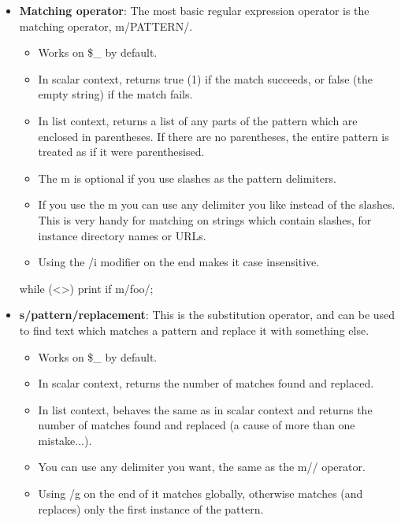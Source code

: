 \documentclass{report}
\begin{document}
    \pagebreak 
    \begin{itemize}
        \item \textbf{Matching operator}: The most basic regular expression operator is the matching operator, m/PATTERN/.
            \begin{itemize}
                \item Works on \$\_ by default.
                \item In scalar context, returns true (1) if the match succeeds, or false (the empty string) if the match fails.
                \item In list context, returns a list of any parts of the pattern which are enclosed in parentheses. If there are no parentheses, the entire pattern is treated as if it were parenthesised.
                \item The m is optional if you use slashes as the pattern delimiters.
                \item If you use the m you can use any delimiter you like instead of the slashes. This is very handy for matching on strings which contain slashes, for instance directory names or URLs.
                \item Using the /i modifier on the end makes it case insensitive.
            \end{itemize}
            \bigbreak \noindent 
            \begin{perlcode}
                while (<>) {
                    print if m/foo/;
                }
            \end{perlcode}
        \item \textbf{s/pattern/replacement}: This is the substitution operator, and can be used to find text which matches a pattern and replace it with something else.
            \begin{itemize}
                \item Works on \$\_ by default.
                \item In scalar context, returns the number of matches found and replaced.
                \item In list context, behaves the same as in scalar context and returns the number of matches found and replaced (a cause of more than one mistake...).
                \item You can use any delimiter you want, the same as the m// operator.
                \item Using /g on the end of it matches globally, otherwise matches (and replaces) only the first instance of the pattern.

\end{itemize}
\end{itemize}
\end{document}
